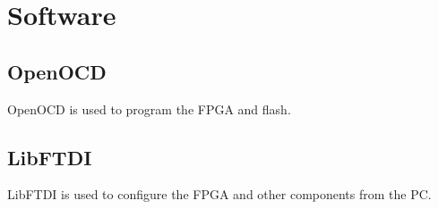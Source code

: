 \chapter{Software}
\label{cha:software}

\section{OpenOCD}
\label{sec:openocd}

OpenOCD is used to program the FPGA and flash.

\section{LibFTDI}
\label{sec:libftdi}

LibFTDI is used to configure the FPGA and other components from the PC\@.

